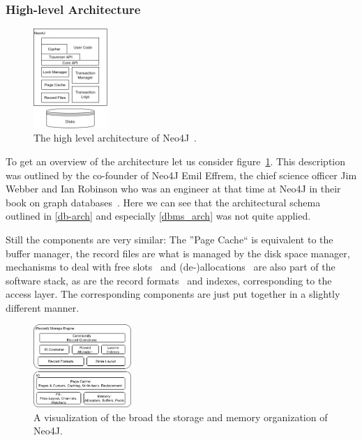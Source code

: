         \subsubsection*{High-level Architecture}
        \begin{figure}[htp]
            \begin{center}
                \includegraphics[keepaspectratio,width=0.25\textwidth]{img/03-preliminaries/N4J_HLA_Emil.png}
            \end{center}
            \caption{The high level architecture of Neo4J~\autocite{robinson2015graph}.} 
            \label{N4J_HLA_Emil}
        \end{figure}
        
        To get an overview of the architecture let us consider figure~\ref{N4J_HLA_Emil}.
        This description was outlined by the co-founder of Neo4J Emil Effrem, the chief science officer Jim Webber and Ian Robinson who was an engineer at that time at Neo4J in their book on graph databases~\autocite{robinson2015graph}.
        Here we can see that the architectural schema outlined in \ref{db-arch} and especially \ref{dbms_arch} was not quite applied.
        
        Still the components are very similar:
        The ''Page Cache`` is equivalent to the buffer manager, the record files are what is managed by the disk space manager, mechanisms to deal with free slots~\autocite{neo4jidgenerator} and (de-)allocations~\autocite{neo4jio} are also part of the software stack, as are the record formats~\autocite{neo4jrecordstorage} and indexes, corresponding to the access layer. 
        The corresponding components are just put together in a slightly different manner. 
        
        \begin{figure}[htp]
            \begin{center}
                \includegraphics[keepaspectratio,width=0.33\textwidth,height=0.3\textheight]{img/03-preliminaries/N4J_Storage.png}
            \end{center}
            \caption{A visualization of the broad the storage and memory organization of Neo4J.} \label{N4J_Storage}
        \end{figure}
        
